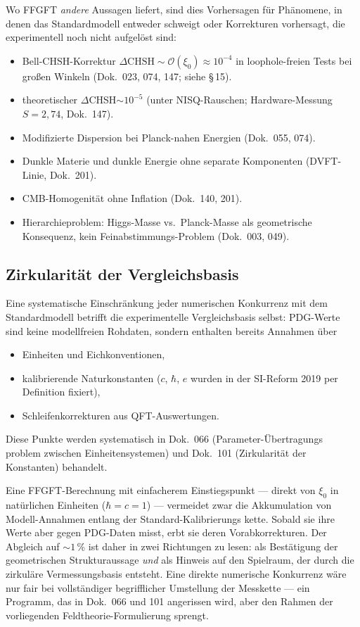Wo FFGFT \emph{andere} Aussagen liefert, sind dies Vorhersagen für
Phänomene, in denen das Standardmodell entweder schweigt oder
Korrekturen vorhersagt, die experimentell noch nicht aufgelöst sind:

\begin{itemize}\setlength\itemsep{0pt}
  \item Bell-CHSH-Korrektur $\Delta\mathrm{CHSH} \sim \mathcal{O}(\xi_0)
        \approx 10^{-4}$ in loophole-freien Tests bei großen Winkeln
        (Dok.~023, 074, 147; siehe \S\,15).
  \item theoretischer $\Delta$CHSH$\sim 10^{-5}$ (unter NISQ-Rauschen;
        Hardware-Messung $S=2{,}74$, Dok.~147).
  \item Modifizierte Dispersion bei Planck-nahen Energien
        (Dok.~055, 074).
  \item Dunkle Materie und dunkle Energie ohne separate Komponenten
        (DVFT-Linie, Dok.~201).
  \item CMB-Homogenität ohne Inflation (Dok.~140, 201).
  \item Hierarchieproblem: Higgs-Masse vs.\ Planck-Masse als
        geometrische Konsequenz, kein Feinabstimmungs-Problem
        (Dok.~003, 049).
\end{itemize}

\subsection*{Zirkularität der Vergleichsbasis}

Eine systematische Einschränkung jeder numerischen Konkurrenz mit dem
Standardmodell betrifft die experimentelle Vergleichsbasis selbst:
PDG-Werte sind keine modellfreien Rohdaten, sondern enthalten bereits
Annahmen über
\begin{itemize}\setlength\itemsep{0pt}
  \item Einheiten und Eichkonventionen,
  \item kalibrierende Naturkonstanten ($c$, $\hbar$, $e$ wurden in der
        SI-Reform 2019 per Definition fixiert),
  \item Schleifenkorrekturen aus QFT-Auswertungen.
\end{itemize}
Diese Punkte werden systematisch in Dok.~066 (Parameter-\"Ubertragungs%
problem zwischen Einheitensystemen) und Dok.~101 (Zirkularität der
Konstanten) behandelt.

Eine FFGFT-Berechnung mit einfacherem Einstiegspunkt --- direkt von
$\xi_0$ in natürlichen Einheiten ($\hbar = c = 1$) --- vermeidet zwar
die Akkumulation von Modell-Annahmen entlang der Standard-Kalibrierungs%
kette. Sobald sie ihre Werte aber gegen PDG-Daten misst, erbt sie
deren Vorabkorrekturen. Der Abgleich auf $\sim 1\,\%$ ist daher in zwei
Richtungen zu lesen: als Bestätigung der geometrischen Strukturaussage
\emph{und} als Hinweis auf den Spielraum, der durch die zirkuläre
Vermessungsbasis entsteht. Eine direkte numerische Konkurrenz wäre
nur fair bei vollständiger begrifflicher Umstellung der Messkette ---
ein Programm, das in Dok.~066 und 101 angerissen wird, aber den Rahmen
der vorliegenden Feldtheorie-Formulierung sprengt.

